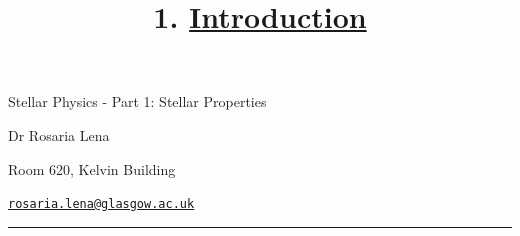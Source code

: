 \documentclass[
  letterpaper,
  DIV=11,
  numbers=noendperiod]{scrartcl}
\title{1. \protect\hyperlink{toc0_}{Introduction}}
\author{}
\date{}
\begin{document}
\maketitle
\ifdefined\Shaded\renewenvironment{Shaded}{\begin{tcolorbox}[enhanced, boxrule=0pt, frame hidden, interior hidden, borderline west={3pt}{0pt}{shadecolor}, breakable, sharp corners]}{\end{tcolorbox}}\fi

Stellar Physics - Part 1: Stellar Properties

Dr Rosaria Lena

Room 620, Kelvin Building

\href{mailto:rosaria.lena@glasgow.ac.uk}{\nolinkurl{rosaria.lena@glasgow.ac.uk}}

\begin{center}\rule{0.5\linewidth}{0.5pt}\end{center}
\end{document}
